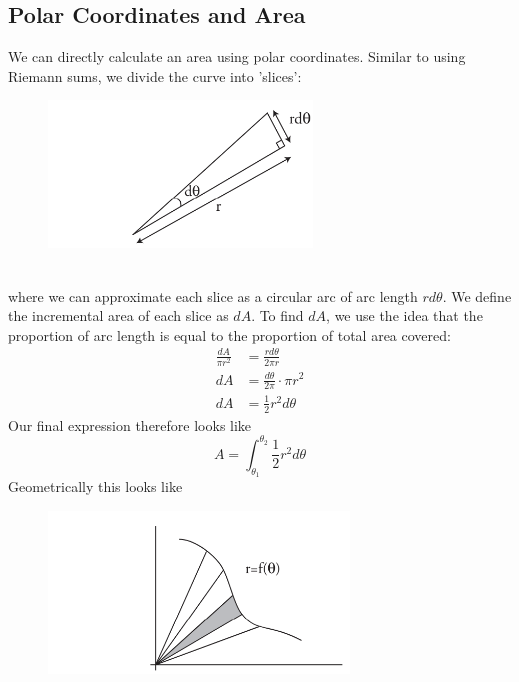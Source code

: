 \documentclass{report}
\begin{document}
\subsection{Polar Coordinates and Area} %
We can directly calculate an area using polar coordinates. Similar to using Riemann sums, we 
divide the curve into 'slices':
\begin{figure}[h]
\includegraphics[width=7cm]{Capture53}\\
\centering
{}
\end{figure}\\
where we can approximate each slice as a circular arc of arc length $rd\theta$. We define the 
incremental area of each slice as $dA$. To find $dA$, we use the idea that the proportion
of arc length is equal to the proportion of total area covered:
\begin{align*}
\frac{dA}{\pi r^2}&=\frac{rd\theta}{2\pi r}\\
dA&=\frac{d\theta}{2\pi }\cdot\pi r^2\\
dA&=\frac{1}{2}r^2d\theta
\end{align*}
Our final expression therefore looks like
\begin{equation*}
A=\int_{\theta_1}^{\theta_2}\frac{1}{2}r^2d\theta
\end{equation*}
Geometrically this looks like
\begin{figure}[h]
\includegraphics[width=8cm]{Capture54}\\
\centering
{}
\end{figure}
\newpage
\end{document}
